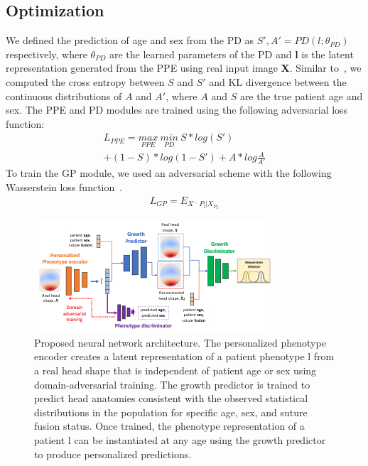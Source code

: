 \documentclass[conference]{IEEEtran}
\begin{document}
\subsection{Optimization}
We defined the prediction of age and sex from the PD as $S',A'=PD(l;\theta_{PD})$ respectively, where $\theta_{PD}$ are the learned parameters of the PD and \textbf{l} is the latent representation generated from the PPE using real input image \textbf{X}. Similar to~\cite{Wang2021Deep}, we computed the cross entropy between $S$ and $S'$ and KL divergence between the continuous distributions of $A$ and $A'$, where $A$ and $S$ are the true patient age and sex. The PPE and PD modules are trained using the following adversarial loss function:
\begin{equation}
    \begin{split}
    L_{PPE}=\underset{PPE}{max}\ \underset{PD}{min}\ S*log(S')\\+(1-S)*log(1-S')+ A *log\frac{A}{A'}
    \end{split}
\end{equation}
To train the GP module, we used an adversarial scheme with the following Wasserstein loss function~\cite{Gulrajani2017Improved}.
\begin{equation}
    \begin{split}
    L_{GP}=E_{{X^-~P_l}|X_{P_x}}
    \end{split}
\end{equation}

\begin{figure}[!t]
\centering
\includegraphics[width=\columnwidth]{figures/NetworkArchitecture.png}
\caption{Proposed neural network architecture. The personalized phenotype encoder creates a latent representation of a patient phenotype l from a real head shape that is independent of patient age or sex using domain-adversarial training. The growth predictor is trained to predict head anatomies consistent with the observed statistical distributions in the population for specific age, sex, and suture fusion status. Once trained, the phenotype representation of a patient l can be instantiated at any age using the growth predictor to produce personalized predictions.}
\label{fig:architecture}
\end{figure}


\end{document}
